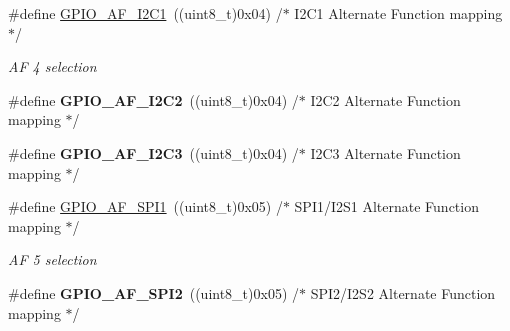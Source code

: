 \begin{DoxyCompactItemize}
\#define \mbox{\hyperlink{group___g_p_i_o___alternat__function__selection__define_gaa246f87c460c4bb4036b8ab39e0220f1}{G\+P\+I\+O\+\_\+\+A\+F\+\_\+\+I2\+C1}}~((uint8\+\_\+t)0x04)  /$\ast$ I2\+C1 Alternate Function mapping $\ast$/
\begin{DoxyCompactList}\small\item\em AF 4 selection ~\newline
 \end{DoxyCompactList}\item 
\mbox{\label{group___g_p_i_o___alternat__function__selection__define_ga4a82500bac7239134e2c28d4656810f1}} 
\#define {\bfseries G\+P\+I\+O\+\_\+\+A\+F\+\_\+\+I2\+C2}~((uint8\+\_\+t)0x04)  /$\ast$ I2\+C2 Alternate Function mapping $\ast$/
\item 
\mbox{\label{group___g_p_i_o___alternat__function__selection__define_ga302620e38b718a54d760845de2a06b2b}} 
\#define {\bfseries G\+P\+I\+O\+\_\+\+A\+F\+\_\+\+I2\+C3}~((uint8\+\_\+t)0x04)  /$\ast$ I2\+C3 Alternate Function mapping $\ast$/
\item 
\mbox{\label{group___g_p_i_o___alternat__function__selection__define_ga7804aaf9275dbb5502312729a76d13be}} 
\#define \mbox{\hyperlink{group___g_p_i_o___alternat__function__selection__define_ga7804aaf9275dbb5502312729a76d13be}{G\+P\+I\+O\+\_\+\+A\+F\+\_\+\+S\+P\+I1}}~((uint8\+\_\+t)0x05)  /$\ast$ S\+P\+I1/\+I2\+S1 Alternate Function mapping $\ast$/
\begin{DoxyCompactList}\small\item\em AF 5 selection ~\newline
 \end{DoxyCompactList}\item 
\mbox{\label{group___g_p_i_o___alternat__function__selection__define_ga45d0fbf9ba0bf0f554697e78712fc369}} 
\#define {\bfseries G\+P\+I\+O\+\_\+\+A\+F\+\_\+\+S\+P\+I2}~((uint8\+\_\+t)0x05)  /$\ast$ S\+P\+I2/\+I2\+S2 Alternate Function mapping $\ast$/
\item 
\mbox{\label{group___g_p_i_o___alternat__function__selection__define_ga6f153ff6680bf07a86191671b89cc583}} 

\end{DoxyCompactItemize}
